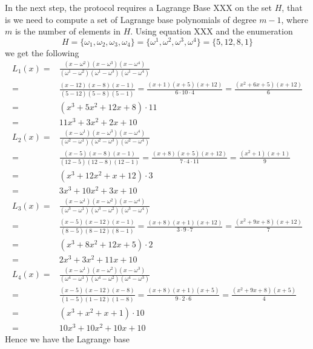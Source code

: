 \begin{example}
In the next step, the protocol requires a Lagrange Base XXX on the set $H$, that is we need to compute a set of Lagrange base polynomials of degree $m-1$, where $m$ is the number of elements in $H$. Using equation XXX and the enumeration 
$$
H= \{\omega_1, \omega_2, \omega_3, \omega_4\} = \{\omega^1,\omega^2,\omega^3, \omega^4\} =  \{5,12,8,1\}
$$
 we get the following
\begin{equation}
\begin{array}{rl}
L_1(x) = &  \frac{(x-\omega^2)(x-\omega^3)(x-\omega^4)}{(\omega^1-\omega^2)(\omega^1-\omega^3)(\omega^1-\omega^4)}\\
       = &  \frac{(x-12)(x-8)(x-1)}{(5-12)(5-8)(5-1)}
       = \frac{(x+1)(x+5)(x+12)}{6\cdot 10\cdot 4}
       = \frac{(x^2+6x+5)(x+12)}{6} \\
       = & (x^3 +5x^2 +12x + 8)\cdot 11 \\
       = & 11x^3 +3x^2 +2x + 10\\
L_2(x) = &  \frac{(x-\omega^1)(x-\omega^3)(x-\omega^4)}{(\omega^2-\omega^1)(\omega^2-\omega^3)(\omega^2-\omega^4)}\\
       = &  \frac{(x-5)(x-8)(x-1)}{(12-5)(12-8)(12-1)}
       =    \frac{(x+8)(x+5)(x+12)}{7\cdot 4\cdot 11}
       =    \frac{(x^2+1)(x+1)}{9} \\
       = &   (x^3 +12x^2+x + 12)\cdot 3 \\
       = &  3x^3 +10x^2+ 3x + 10\\
L_3(x) = &  \frac{(x-\omega^1)(x-\omega^2)(x-\omega^4)}{(\omega^3-\omega^1)(\omega^3-\omega^2)(\omega^3-\omega^4)}\\
       = &  \frac{(x-5)(x-12)(x-1)}{(8-5)(8-12)(8-1)}
       =   \frac{(x+8)(x+1)(x+12)}{3\cdot 9\cdot 7}
       =   \frac{(x^2+9x+8)(x+12)}{7} \\
       = &   (x^3 + 8x^2 +12x +5) \cdot 2\\
       = &  2x^3 + 3x^2 +11x +10 \\
L_4(x) = &  \frac{(x-\omega^1)(x-\omega^2)(x-\omega^3)}{(\omega^4-\omega^1)(\omega^4-\omega^2)(\omega^4-\omega^3)}\\
       = &  \frac{(x-5)(x-12)(x-8)}{(1-5)(1-12)(1-8)}
       = \frac{(x+8)(x+1)(x+5)}{9\cdot 2\cdot 6}
       = \frac{(x^2 +9x + 8)(x+5)}{4} \\
       = & (x^3 + x^2 +x + 1)\cdot 10 \\
       = & 10x^3 + 10 x^2 +10x + 10
\end{array}
\end{equation}
Hence we have the Lagrange base
\begin{multline}

\end{multline}
\end{example}
